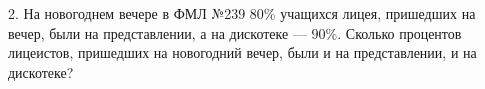 2. На новогоднем вечере в ФМЛ №239 $80\%$ учащихся лицея, пришедших на вечер, были на представлении, а на дискотеке --- $90\%$. Сколько процентов лицеистов, пришедших на новогодний вечер, были и на представлении, и на дискотеке?\\
